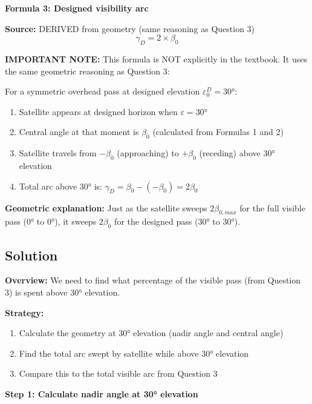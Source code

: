\documentclass[11pt,letterpaper]{article}
\begin{document}
\vspace{0.3cm}

\textbf{Formula 3: Designed visibility arc}

\textbf{Source:} DERIVED from geometry (same reasoning as Question 3)
\begin{equation}
\gamma_D = 2 \times \beta_0
\end{equation}

\textbf{IMPORTANT NOTE:} This formula is NOT explicitly in the textbook. It uses the same geometric reasoning as Question 3:

For a symmetric overhead pass at designed elevation $\varepsilon_0^D = 30°$:
\begin{enumerate}
    \item Satellite appears at designed horizon when $\varepsilon = 30°$
    \item Central angle at that moment is $\beta_0$ (calculated from Formulas 1 and 2)
    \item Satellite travels from $-\beta_0$ (approaching) to $+\beta_0$ (receding) above 30° elevation
    \item Total arc above 30° is: $\gamma_D = \beta_0 - (-\beta_0) = 2\beta_0$
\end{enumerate}

\textbf{Geometric explanation:} Just as the satellite sweeps $2\beta_{0,max}$ for the full visible pass (0° to 0°), it sweeps $2\beta_0$ for the designed pass (30° to 30°).

\subsection{Solution}

\textbf{Overview:} We need to find what percentage of the visible pass (from Question 3) is spent above 30° elevation.

\textbf{Strategy:}
\begin{enumerate}
    \item Calculate the geometry at 30° elevation (nadir angle and central angle)
    \item Find the total arc swept by satellite while above 30° elevation
    \item Compare this to the total visible arc from Question 3
\end{enumerate}

\vspace{0.3cm}

\textbf{Step 1: Calculate nadir angle at 30° elevation}
\end{document}
